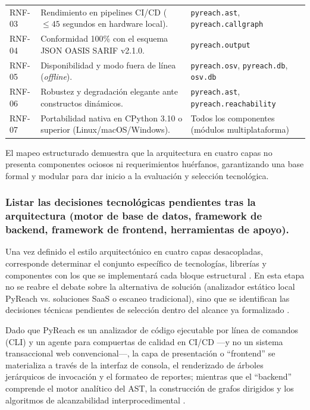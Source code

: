 \begin{table}[H]
\begin{tabularx}{\textwidth}{l p{7.5cm} X}
RNF-03 & Rendimiento en pipelines CI/CD ($\le 45$ segundos en hardware local). & \texttt{pyreach.\allowbreak ast}, \texttt{pyreach.\allowbreak callgraph} \\
RNF-04 & Conformidad 100\% con el esquema JSON OASIS SARIF v2.1.0. & \texttt{pyreach.\allowbreak output} \\
RNF-05 & Disponibilidad y modo fuera de línea (\textit{offline}). & \texttt{pyreach.\allowbreak osv}, \texttt{pyreach.\allowbreak db}, \texttt{osv.\allowbreak db} \\
RNF-06 & Robustez y degradación elegante ante constructos dinámicos. & \texttt{pyreach.\allowbreak ast}, \texttt{pyreach.\allowbreak reachability} \\
RNF-07 & Portabilidad nativa en CPython 3.10 o superior (Linux/macOS/Windows). & Todos los componentes (módulos multiplataforma) \\
\bottomrule
\end{tabularx}
\end{table}

El mapeo estructurado demuestra que la arquitectura en cuatro capas no presenta componentes ociosos ni requerimientos huérfanos, garantizando una base formal y modular para dar inicio a la evaluación y selección tecnológica.

\subsubsection{Listar las decisiones tecnológicas pendientes tras la arquitectura (motor de base de datos, framework de backend, framework de frontend, herramientas de apoyo).}
Una vez definido el estilo arquitectónico en cuatro capas desacopladas, corresponde determinar el conjunto específico de tecnologías, librerías y componentes con los que se implementará cada bloque estructural \cite{pressman2020software, martin2017cleanarch}. En esta etapa no se reabre el debate sobre la alternativa de solución (analizador estático local PyReach vs. soluciones SaaS o escaneo tradicional), sino que se identifican las decisiones técnicas pendientes de selección dentro del alcance ya formalizado \cite{torres2026proyecto}.

Dado que PyReach es un analizador de código ejecutable por línea de comandos (CLI) y un agente para compuertas de calidad en CI/CD ---y no un sistema transaccional web convencional---, la capa de presentación o ``frontend'' se materializa a través de la interfaz de consola, el renderizado de árboles jerárquicos de invocación y el formateo de reportes; mientras que el ``backend'' comprende el motor analítico del AST, la construcción de grafos dirigidos y los algoritmos de alcanzabilidad interprocedimental \cite{salis2021pycg, oasis2019sarif}.

